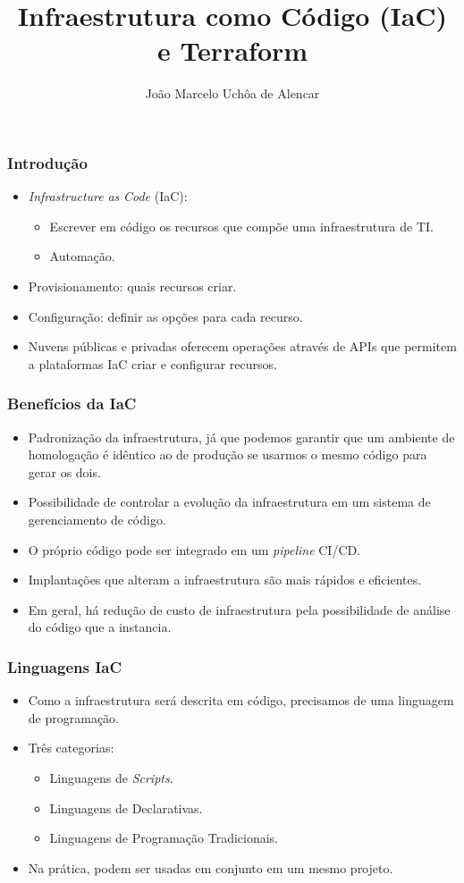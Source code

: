 \documentclass{beamer}
\title{Infraestrutura como Código (IaC) e Terraform}
\author[João Marcelo Uchôa de Alencar]{João Marcelo Uchôa de Alencar}
\institute{Universidade Federal do Ceará - Quixadá}
\begin{document}
   \begin{frame}
      \titlepage
   \end{frame}

   \begin{frame}
      \frametitle{Introdução}
      \begin{itemize}
      \item \textit{Infrastructure}\textit{ as }\textit{Code} (IaC):
      \begin{itemize}
      \item Escrever em código os recursos que compõe uma infraestrutura de TI.
      \item Automação.
      \end{itemize}
      \item Provisionamento: quais recursos criar.
      \item Configuração: definir as opções para cada recurso.
      \item Nuvens públicas e privadas oferecem operações através de APIs que permitem a plataformas IaC criar e configurar recursos. 
      \end{itemize}
   \end{frame}

   \begin{frame}
      \frametitle{Benefícios da IaC}
      \begin{itemize}
      \item Padronização da infraestrutura, já que podemos garantir que um ambiente de homologação é idêntico ao de produção se usarmos o mesmo código para gerar os dois.
      \item Possibilidade de controlar a evolução da infraestrutura em um sistema de gerenciamento de código.
      \item O próprio código pode ser integrado em um \textit{pipeline} CI/CD.
      \item Implantações que alteram a infraestrutura são mais rápidos e eficientes.
      \item Em geral, há redução de custo de infraestrutura pela possibilidade de análise do código que a instancia. 
      \end{itemize}
   \end{frame}

   \begin{frame}
      \frametitle{Linguagens IaC}
      \begin{itemize}
      \item Como a infraestrutura será descrita em código, precisamos de uma linguagem de programação.
      \item Três categorias:
      \begin{itemize}
      \item Linguagens de \textit{Scripts}.
      \item Linguagens de Declarativas.
      \item Linguagens de Programação Tradicionais.
      \end{itemize}
      \item Na prática, podem ser usadas em conjunto em um mesmo projeto.
      \end{itemize}
   \end{frame}
\end{document}
